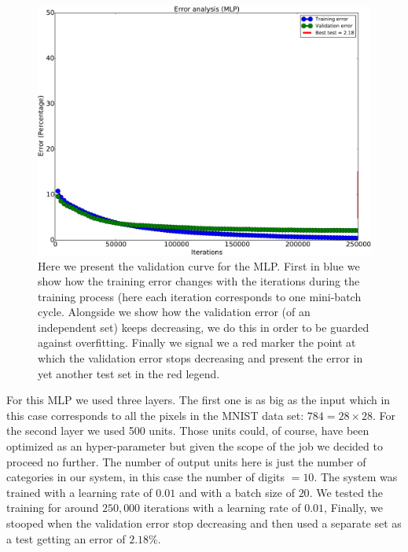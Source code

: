 \documentclass[11pt,a4paper]{article}
\begin{document}
\begin{center}
\begin{figure}[H]
\centering
\includegraphics[scale=.45]{mlp_validation.pdf} 
\caption{Here we present the validation curve for the MLP. First in blue we show how the training error changes with the iterations during the training process (here each iteration corresponds to one mini-batch cycle. Alongside we show how the validation error (of an independent set) keeps decreasing, we do this in order to be guarded against overfitting. Finally we signal we a red marker the point at which the validation error stops decreasing and present the error in yet another test set in the red legend.}
\label{fig:mlp_valiudation}
\end{figure} 
\end{center}

For this MLP we used three layers. The first one is as big as the input which in this case corresponds to all the pixels in the MNIST data set: $784 = 28 \times 28$. For the second layer we used 500 units. Those units could, of course, have been optimized as an hyper-parameter but given the scope of the job we decided to proceed no further. The number of output units here is just the number of categories in our system, in this case the number of digits $=10$. The system was trained with a learning rate of $0.01$ and with a batch size of $20$. We tested the training for around $250,000$ iterations with a learning rate of $0.01$, Finally, we stooped when the validation error stop decreasing and then used a separate set as a test getting an error of $2.18 \%$. 
\end{document}
